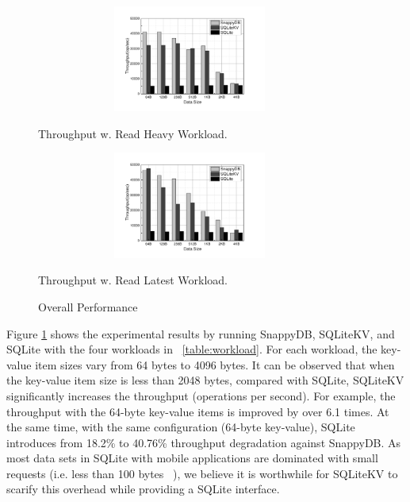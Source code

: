 \begin{figure}
	\centering
	\begin{minipage}[t]{0.4\textwidth}
		\centering
		\includegraphics[width=0.9\textwidth, height=3.5cm]{Ext/workload3.pdf}
		\vspace*{-0.2cm}
		\caption{\small Throughput w. Read Heavy Workload.}
		\label{fig:workload3}
	\end{minipage}%
	\hspace*{0.7cm}
	\begin{minipage}[t]{0.4\textwidth}
		\centering
		\includegraphics[width=0.9\textwidth, height=3.5cm]{Ext/workload4.pdf}
		\vspace*{-0.2cm}
		\caption{\small Throughput w. Read Latest Workload.}
		\label{fig:workload4}
	\end{minipage}
	
	\caption{\small Overall Performance}
	\label{fig:overallPerformance}
\end{figure}
Figure \ref{fig:overallPerformance} shows the experimental results by running SnappyDB, SQLiteKV, and SQLite with the four workloads in ~\ref{table:workload}. For each workload, the key-value item sizes vary from 64 bytes to 4096 bytes. It can be observed that when the key-value item size is less than 2048 bytes, compared with SQLite, SQLiteKV significantly increases the throughput (operations per second). For example, the throughput with the 64-byte key-value items is improved by over 6.1 times. At the same time, with the same configuration (64-byte key-value), SQLite introduces from 18.2\% to 40.76\% throughput degradation against SnappyDB. As most data sets in SQLite with mobile applications are dominated with small requests (i.e. less than 100 bytes ~\cite{atikoglu2012workload}), we believe it is worthwhile for SQLiteKV to scarify this overhead while providing a SQLite interface.     

